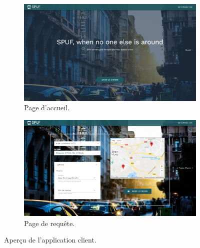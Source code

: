 \begin{figure}[h!]

	 \begin{subfigure}[b]{\linewidth}
	 	\includegraphics[width=\linewidth]{img/spuf/acceuil.png}
	 	\caption{Page d'accueil.}
	 \end{subfigure}
	 
	 \begin{subfigure}[b]{\linewidth}
	 	\includegraphics[width=\linewidth]{img/spuf/request.png}
	 	\caption{Page de requête.}	 
	 \end{subfigure}
	 
	\caption{Aperçu de l'application client.}
	 \label{fig:clientInterface}
\end{figure}


